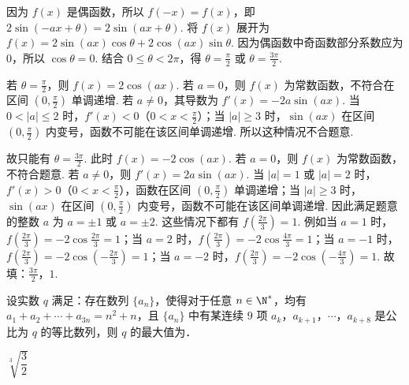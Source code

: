 \begin{solution}
因为 \(f(x)\) 是偶函数，所以 \(f(-x)=f(x)\)，即 \(2\sin\left( -ax+\theta \right)=2\sin\left( ax+\theta \right)\). 将 \(f(x)\) 展开为 \(f(x)=2\sin\left( ax \right)\cos\theta+2\cos\left( ax \right)\sin\theta\). 因为偶函数中奇函数部分系数应为 \(0\)，所以 \(\cos\theta=0\). 结合 \(0\le \theta<2\pi\)，得 \(\theta=\frac{\pi}{2}\) 或 \(\theta=\frac{3\pi}{2}\).

若 \(\theta=\frac{\pi}{2}\)，则 \(f(x)=2\cos\left( ax \right)\). 若 \(a=0\)，则 \(f(x)\) 为常数函数，不符合在区间 \(\left( 0,\frac{\pi}{2} \right)\) 单调递增. 若 \(a\ne 0\)，其导数为 \(f'(x)=-2a\sin\left( ax \right)\).
当 \(0<|a|\le 2\) 时，\(f'(x)<0\)（\(0<x<\frac{\pi}{2}\)）；当 \(|a|\ge 3\) 时，\(\sin\left( ax \right)\) 在区间 \(\left( 0,\frac{\pi}{2} \right)\) 内变号，函数不可能在该区间单调递增. 所以这种情况不合题意.

故只能有 \(\theta=\frac{3\pi}{2}\). 此时 \(f(x)=-2\cos\left( ax \right)\). 若 \(a=0\)，则 \(f(x)\) 为常数函数，不符合题意. 若 \(a\ne 0\)，则 \(f'(x)=2a\sin\left( ax \right)\).
当 \(|a|=1\) 或 \(|a|=2\) 时，\(f'(x)>0\)（\(0<x<\frac{\pi}{2}\)），函数在区间 \(\left( 0,\frac{\pi}{2} \right)\) 单调递增；当 \(|a|\ge 3\) 时，\(\sin\left( ax \right)\) 在区间 \(\left( 0,\frac{\pi}{2} \right)\) 内变号，函数不可能在该区间单调递增.
因此满足题意的整数 \(a\) 为 \(a=\pm1\) 或 \(a=\pm2\). 这些情况下都有 \(f\left( \frac{2\pi}{3} \right)=1\). 例如当 \(a=1\) 时，\(f\left( \frac{2\pi}{3} \right)=-2\cos \frac{2\pi}{3}=1\)；当 \(a=2\) 时，\(f\left( \frac{2\pi}{3} \right)=-2\cos \frac{4\pi}{3}=1\)；当 \(a=-1\) 时，\(f\left( \frac{2\pi}{3} \right)=-2\cos \left( -\frac{2\pi}{3} \right)=1\)；当 \(a=-2\) 时，\(f\left( \frac{2\pi}{3} \right)=-2\cos \left( -\frac{4\pi}{3} \right)=1\).
故填：\(\frac{3\pi}{2}\)，\(1\).
\end{solution}

\begin{problem}
设实数 \(q\) 满足：存在数列 \(\{a_n\}\)，使得对于任意 \(n\in\N^*\)，均有 \(a_1+a_2+\cdots+a_{3n}=n^2+n\)，且 \(\{a_n\}\) 中有某连续 \(9\) 项 \(a_k\)，\(a_{k+1}\)，\(\cdots\)，\(a_{k+8}\) 是公比为 \(q\) 的等比数列，则 \(q\) 的最大值为\fillinblank{}．
\end{problem}

\begin{answer}
\(\sqrt[3]{\dfrac{3}{2}}\)
\end{answer}

